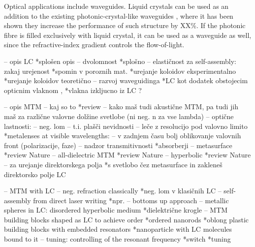 \documentclass[a4paper,10pt]{article}
\begin{document}
Optical applications include waveguides. 
Liquid crystals can be used as an addition to the existing photonic-crystal-like waveguides \cite{dd}, where it has been shown they increase the performance of such structure by XX\%. 
If the photonic fibre is filled exclusively with liquid crystal, it can be used as a waveguide as well, since the refractive-index gradient controls the flow-of-light. 

-- opis LC *splošen opis \cite{degennes}
  -- dvolomnost *splošno \cite{hecht-optics}
  -- elastičnost za self-assembly: zakaj urejenost *spomin v poroznih mat. \cite{tanaka-lc-memory-porous} 
                                                   *urejanje koloidov eksperimentalno \cite{musevic-2013-assembly,smalyukh-2009-assembly} 
                                                   *urejanje koloidov teoretično \cite{zumer-2012-colloidal-assembly}
  -- razvoj waveguidinga *LC kot dodatek obstojecim opticnim vlaknom \cite{kitzerow-2014-lc-fibre,zografopoulos-2012-lc-fibre}, 
                         *vlakna izkljucno iz LC \cite{cancula-2016-waveguiding}? 

-- opis MTM
  -- kaj so to *review \cite{wegener-2011-nature-review}
  -- kako maš tudi akustične MTM, pa tudi jih maš za različne valovne dolžine svetlobe (ni neg. n za vse lambda)
  -- optične lastnosti: 
    -- neg. lom \cite{schultz-2000-first-mtm,zhang-2008-fishnet}
    -- t.i. plašči nevidnosti \cite{zhang-2015-skin-cloak}
    -- leče z resolucijo pod valovno limito *metalenses at visible wavelengths: \cite{capasso-2016-metalens}
    -- v zadnjem času bolj oblikovanje valovnih front (polarizacije, faze) \cite{capasso-2014-flat-optics-metasurface}
    -- nadzor transmitivnosti *absorberji \cite{padilla-2012-mtm-absorbers}
    -- metasurface *review Nature \cite{meinzer-2014-metasurface}
    -- all-dielectric MTM *review Nature \cite{jacob-2016-all-dielectric}
    -- hyperbolic *review Nature \cite{kivshar-2013-hyperbolic}
    -- za urejanje direktorskega polja *s svetlobo čez metasurface in zakleneš direktorsko polje LC \cite{ozaki-2016-patterned-lc}

-- MTM with LC
  -- neg. refraction classically *neg. lom v klasičnih LC \cite{lavrentovich-2006-lc-neg,assanto-2007-nematicons-lc-neg}
  -- self-assembly from direct laser writing *npr. \cite{tartan-2017-dlw} -- bottoms up approach
  -- metallic spheres in LC: disordered hyperbolic medium *dielektrične krogle \cite{xuan-2013-nanoparticle-lc,khoo-2014-nanoparticle-lc}
  -- MTM building blocks shaped as LC to achieve order *ordered nanorods \cite{lavrentovich-2008-gold-nanorods,smalyukh-2010-self-alignment,lavrentovich-2009-nanorods} 
                                                       *oblong plastic building blocks with embedded resonators \cite{shadrivov-2016-meta-liquid-crystal}
                                                       *nanoparticle with LC molecules bound to it \cite{goodby-2011-lc-gold-mtm}
  -- tuning: controlling of the resonant frequency *switch \cite{buchnev-2015-lc-mtm-switch}
                                                   *tuning \cite{zhang-2007-lc-mtm-tuning}
\end{document}
